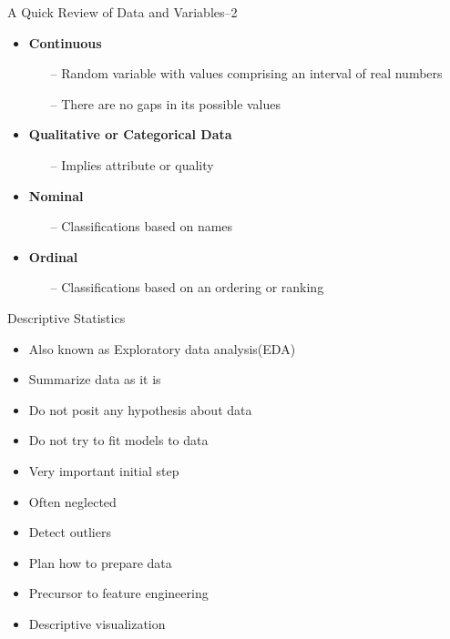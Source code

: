 \documentclass[10pt,dvipsnames, aspectratio=169]{beamer}
\begin{document}
\begin{frame}[t]{A Quick Review of Data and Variables--2}
	\begin{itemize}
		\item \textbf{Continuous}
		\begin{itemize}
			\item[--] Random variable with values comprising an interval of
			real numbers
			\item [--]  There are no gaps in its possible values
		\end{itemize}
	\end{itemize}
	
	
	\begin{itemize}
		\item\textbf{Qualitative or Categorical Data}
		\begin{itemize}
			\item[--] Implies attribute or quality
		\end{itemize}
	\end{itemize}
	
	\begin{itemize}
		\item \textbf{Nominal}
		\begin{itemize}
			\item[--] Classifications based on names
		\end{itemize}
	\end{itemize}
	
	\begin{itemize}
		\item \textbf{Ordinal}
		\begin{itemize}
			\item[--] Classifications based on an ordering or ranking
		\end{itemize}
	\end{itemize}
\end{frame}
\begin{frame}[t]{Descriptive Statistics}
	\begin{itemize}
		\item Also known as Exploratory data analysis(EDA) 
		\item Summarize data as it is 
		\item Do not posit any hypothesis about data
		\item Do not try to fit models to data
		\item Very important initial step
		\item Often neglected 
		\item Detect outliers
		\item Plan how to prepare data
		\item Precursor to feature engineering
		\item Descriptive visualization
	\end{itemize}
\end{frame}
\end{document}

